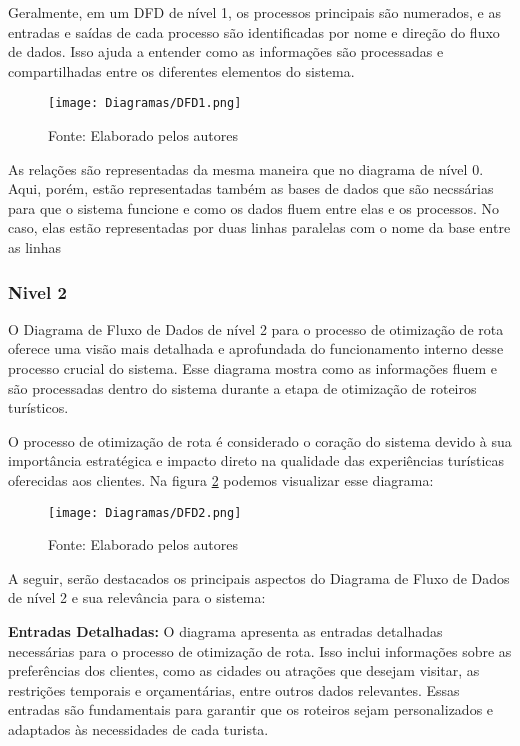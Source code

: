 Geralmente, em um DFD de nível 1, os processos principais são numerados, e as entradas e saídas de cada processo são identificadas por nome e direção do fluxo de dados. Isso ajuda a entender como as informações são processadas e compartilhadas entre os diferentes elementos do sistema.

\begin{figure}[H]
    \centering
    \caption{Diagrama Fluxo de Dados - Nível 1}
    \label{fig:DFD1}
    \texttt{[image: Diagramas/DFD1.png]}\\
    \caption*{Fonte: Elaborado pelos autores}
\end{figure}

As relações são representadas da mesma maneira que no diagrama de nível 0. Aqui, porém, estão representadas também as bases de dados que são necssárias para que o sistema funcione e como os dados fluem entre elas e os processos. No caso, elas estão representadas por duas linhas paralelas com o nome da base entre as linhas


\subsubsection{Nivel 2}

O Diagrama de Fluxo de Dados de nível 2 para o processo de otimização de rota oferece uma visão mais detalhada e aprofundada do funcionamento interno desse processo crucial do sistema. Esse diagrama mostra como as informações fluem e são processadas dentro do sistema durante a etapa de otimização de roteiros turísticos.

O processo de otimização de rota é considerado o coração do sistema devido à sua importância estratégica e impacto direto na qualidade das experiências turísticas oferecidas aos clientes.  Na figura \ref{fig:DFD2} podemos visualizar esse diagrama:

\begin{figure}[H]
    \centering
    \caption{Diagrama Fluxo de Dados - Nível 2}
    \label{fig:DFD2}
    \texttt{[image: Diagramas/DFD2.png]}\\
    \caption*{Fonte: Elaborado pelos autores}
\end{figure}

A seguir, serão destacados os principais aspectos do Diagrama de Fluxo de Dados de nível 2 e sua relevância para o sistema:

    \textbf{Entradas Detalhadas:} O diagrama apresenta as entradas detalhadas necessárias para o processo de otimização de rota. Isso inclui informações sobre as preferências dos clientes, como as cidades ou atrações que desejam visitar, as restrições temporais e orçamentárias, entre outros dados relevantes. Essas entradas são fundamentais para garantir que os roteiros sejam personalizados e adaptados às necessidades de cada turista.

